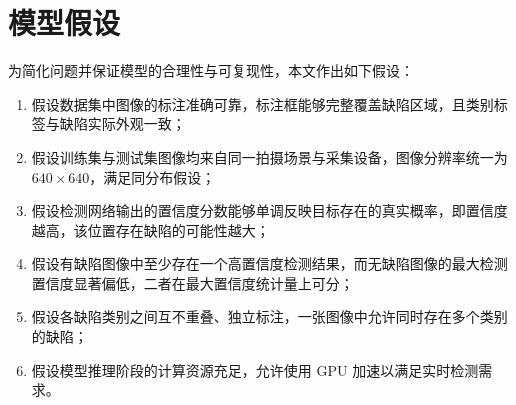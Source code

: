 \section{模型假设}

为简化问题并保证模型的合理性与可复现性，本文作出如下假设：

\begin{enumerate}[leftmargin=2.2em,itemsep=2pt]
  \item 假设数据集中图像的标注准确可靠，标注框能够完整覆盖缺陷区域，且类别标签与缺陷实际外观一致；
  \item 假设训练集与测试集图像均来自同一拍摄场景与采集设备，图像分辨率统一为 $640\times640$，满足同分布假设；
  \item 假设检测网络输出的置信度分数能够单调反映目标存在的真实概率，即置信度越高，该位置存在缺陷的可能性越大；
  \item 假设有缺陷图像中至少存在一个高置信度检测结果，而无缺陷图像的最大检测置信度显著偏低，二者在最大置信度统计量上可分；
  \item 假设各缺陷类别之间互不重叠、独立标注，一张图像中允许同时存在多个类别的缺陷；
  \item 假设模型推理阶段的计算资源充足，允许使用 GPU 加速以满足实时检测需求。
\end{enumerate}
